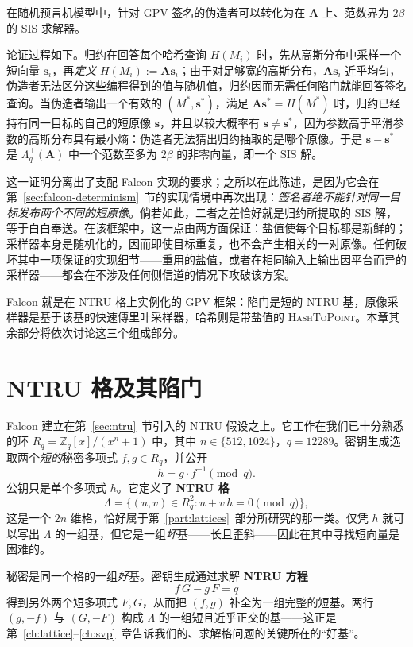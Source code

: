 \begin{proposition}
在随机预言机模型中，针对 GPV 签名的伪造者可以转化为在 $\mathbf{A}$ 上、范数界为 $2\beta$ 的 SIS 求解器。
\end{proposition}

论证过程如下。归约在回答每个哈希查询 $H(M_i)$ 时，先从高斯分布中采样一个短向量 $\mathbf{s}_i$，再\emph{定义} $H(M_i) := \mathbf{A}\mathbf{s}_i$；由于对足够宽的高斯分布，$\mathbf{A}\mathbf{s}_i$ 近乎均匀，伪造者无法区分这些编程得到的值与随机值，归约因而无需任何陷门就能回答签名查询。当伪造者输出一个有效的 $(M^{*}, \mathbf{s}^{*})$，满足 $\mathbf{A}\mathbf{s}^{*} = H(M^{*})$ 时，归约已经持有同一目标的自己的短原像 $\mathbf{s}$，并且以较大概率有 $\mathbf{s} \neq \mathbf{s}^{*}$，因为参数高于平滑参数的高斯分布具有最小熵：伪造者无法猜出归约抽取的是哪个原像。于是 $\mathbf{s} - \mathbf{s}^{*}$ 是 $\Lambda^{\perp}_q(\mathbf{A})$ 中一个范数至多为 $2\beta$ 的非零向量，即一个 SIS 解。

这一证明分离出了支配 Falcon 实现的要求；之所以在此陈述，是因为它会在第~\ref{sec:falcon-determinism}~节的实现情境中再次出现：\emph{签名者绝不能针对同一目标发布两个不同的短原像}。倘若如此，二者之差恰好就是归约所提取的 SIS 解，等于白白奉送。在该框架中，这一点由两方面保证：盐值使每个目标都是新鲜的；采样器本身是随机化的，因而即使目标重复，也不会产生相关的一对原像。任何破坏其中一项保证的实现细节——重用的盐值，或者在相同输入上输出因平台而异的采样器——都会在不涉及任何侧信道的情况下攻破该方案。

Falcon 就是在 NTRU 格上实例化的 GPV 框架：陷门是短的 NTRU 基，原像采样器是基于该基的快速傅里叶采样器，哈希则是带盐值的 \textsc{HashToPoint}。本章其余部分将依次讨论这三个组成部分。

\section{NTRU 格及其陷门}

Falcon 建立在第~\ref{sec:ntru}~节引入的 NTRU 假设之上。它工作在我们已十分熟悉的环 $R_q = \mathbb{Z}_q[x]/(x^n+1)$ 中，其中 $n \in \{512, 1024\}$，$q = 12289$。密钥生成选取两个\emph{短的}秘密多项式 $f, g \in R_q$，并公开
\[
h = g \cdot f^{-1} \pmod q.
\]
公钥只是单个多项式 $h$。它定义了 \textbf{NTRU 格}
\[
\Lambda = \{ (u, v) \in R_q^2 : u + v\,h = 0 \pmod q \},
\]
这是一个 $2n$ 维格，恰好属于第~\ref{part:lattices}~部分所研究的那一类。仅凭 $h$ 就可以写出 $\Lambda$ 的一组基，但它是一组\emph{坏}基——长且歪斜——因此在其中寻找短向量是困难的。

秘密是同一个格的一组\emph{好}基。密钥生成通过求解 \textbf{NTRU 方程}
\[
f\,G - g\,F = q
\]
得到另外两个短多项式 $F, G$，从而把 $(f,g)$ 补全为一组完整的短基。两行 $(g, -f)$ 与 $(G, -F)$ 构成 $\Lambda$ 的一组短且近乎正交的基——这正是第~\ref{ch:lattice}--\ref{ch:svp}~章告诉我们的、求解格问题的关键所在的“好基”。

